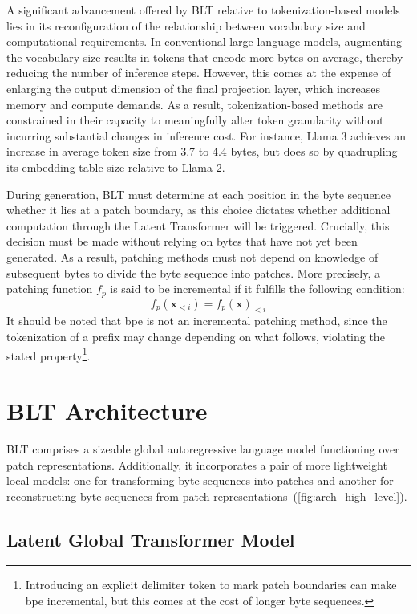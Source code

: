 A significant advancement offered by {\textsc BLT} relative to tokenization-based models lies in its reconfiguration of the relationship between vocabulary size and computational requirements. In conventional large language models, augmenting the vocabulary size results in tokens that encode more bytes on average, thereby reducing the number of inference steps. However, this comes at the expense of enlarging the output dimension of the final projection layer, which increases memory and compute demands. As a result, tokenization-based methods are constrained in their capacity to meaningfully alter token granularity without incurring substantial changes in inference cost. For instance, Llama 3 achieves an increase in average token size from 3.7 to 4.4 bytes, but does so by quadrupling its embedding table size relative to Llama 2.

During generation, {\textsc BLT} must determine at each position in the byte sequence whether it lies at a patch boundary, as this choice dictates whether additional computation through the Latent Transformer will be triggered. Crucially, this decision must be made without relying on bytes that have not yet been generated. As a result, patching methods must not depend on knowledge of subsequent bytes to divide the byte sequence into patches. More precisely, a patching function $f_p$ is said to be incremental if it fulfills the following condition:
$$f_p(\pmb{x}_{<i}) = f_p(\pmb{x})_{<i}$$
It should be noted that bpe is not an incremental patching method, since the tokenization of a prefix may change depending on what follows, violating the stated property\footnote{Introducing an explicit delimiter token to mark patch boundaries can make bpe incremental, but this comes at the cost of longer byte sequences.}.

\section{{\textsc BLT} Architecture}
\label{section:architecture}
{\textsc BLT} comprises a sizeable global autoregressive language model functioning over patch representations. Additionally, it incorporates a pair of more lightweight local models: one for transforming byte sequences into patches and another for reconstructing byte sequences from patch representations~(\autoref{fig:arch_high_level}).

\subsection{Latent Global Transformer Model}

